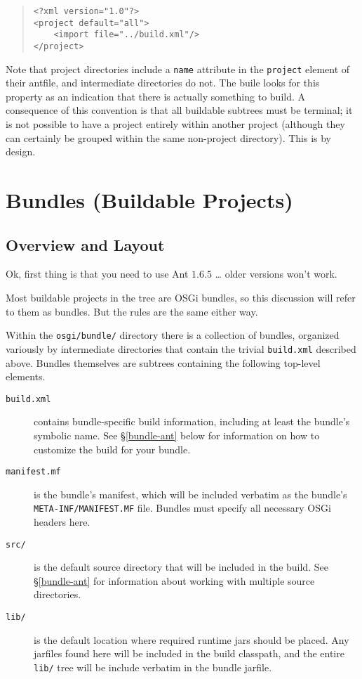 \documentclass{report}
\begin{document}
\begin{quote}\begin{scriptsize}\begin{verbatim}
<?xml version="1.0"?>
<project default="all">
    <import file="../build.xml"/>
</project>
\end{verbatim}\end{scriptsize}\end{quote}

Note that project directories include a {\tt name} attribute in the {\tt project}
element of their antfile, and intermediate directories do not. The buile looks for
this property as an indication that there is actually something to build. A 
consequence of this convention is that all buildable subtrees must be terminal; it
is not possible to have a project entirely within another project (although they can
certainly be grouped within the same non-project directory). This is by design. 

\section{Bundles (Buildable Projects)}

\subsection{Overview and Layout}
\label{build-bundles}
Ok, first thing is that you need to use Ant $1.6.5$ \ldots{} older versions won't
work.

Most buildable projects in the tree are OSGi bundles, so this discussion will refer
to them as bundles. But the rules are the same either way.

Within the {\tt osgi/bundle/} directory there is a collection of bundles, organized
variously by intermediate directories that contain the trivial {\tt build.xml} 
described above. Bundles themselves are subtrees containing the following top-level
elements. 

\begin{description}
\item[\tt build.xml] contains bundle-specific build information, including at 
least the bundle's symbolic name. See \S\ref{bundle-ant} below for information 
on how to customize the build for your bundle.
\item[\tt manifest.mf] is the bundle's manifest, which will be included 
verbatim as the bundle's {\tt META-INF/MANIFEST.MF} file. Bundles must specify 
all necessary OSGi headers here.
\item[\tt src/] is the default source directory that will be included in the 
build. See \S\ref{bundle-ant} for information about working with multiple 
source directories.
\item[\tt lib/] is the default location where required runtime jars should be 
placed. Any jarfiles found here will be included in the build classpath, and 
the entire {\tt lib/} tree will be include verbatim in the bundle jarfile.
\end{description}
\end{document}

